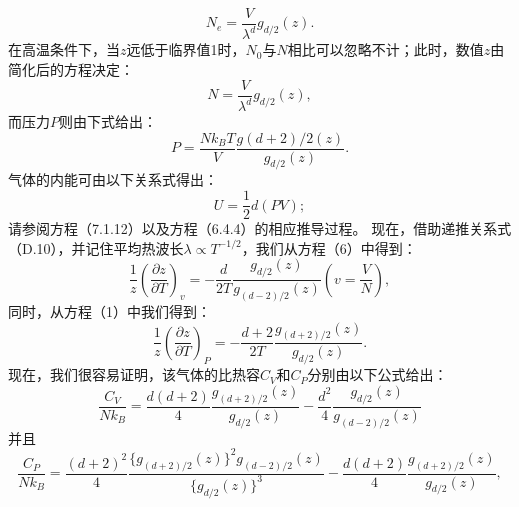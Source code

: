 \begin{equation}\tag{13.6.5}\label{eq:13.6.5}
N _ { e } = \frac { V } { \lambda ^{d} } g _ { d / 2 } ( z ) .
\end{equation}
在高温条件下，当\(z\)远低于临界值1时，\(N_0\)与\(N\)相比可以忽略不计；此时，数值\(z\)由简化后的方程决定：
\begin{equation}\tag{13.6.6}\label{eq:13.6.6}
N = \frac { V } { \lambda ^{d} } g _ { d / 2 } ( z ) ,
\end{equation}
而压力\(P\)则由下式给出：
\begin{equation}\tag{13.6.7}\label{eq:13.6.7}
P = \frac { N k _ { B } T } { V } \frac { g ( d + 2 ) / 2 ( z ) } { g _ { d / 2 } ( z ) } .
\end{equation}
气体的内能可由以下关系式得出：
\begin{equation}\tag{13.6.8}\label{eq:13.6.8}
U = { \frac { 1 } { 2 } } d ( P V ) ;
\end{equation}
请参阅方程（7.1.12）以及方程（6.4.4）的相应推导过程。
现在，借助递推关系式（D.10），并记住平均热波长\(\lambda \propto T^{-1/2}\)，我们从方程（6）中得到：
\begin{equation}\tag{13.6.9}\label{eq:13.6.9}
\frac { 1 } { z } \left( \frac { \partial z } { \partial T } \right) _ { v } = - \frac { d } { 2 T } \frac { g _ { d / 2 } ( z ) } { g _ { ( d - 2 ) / 2 } ( z ) }  \left( v = \frac { V } { N } \right) ,
\end{equation}
同时，从方程（1）中我们得到：
\begin{equation}\tag{13.6.10}\label{eq:13.6.10}
\frac { 1 } { z } \left( \frac { \partial z } { \partial T } \right) _ { P } = - \frac { d + 2 } { 2 T } \frac { g _ { ( d + 2 ) / 2 } ( z ) } { g _ { d / 2 } ( z ) } .
\end{equation}
现在，我们很容易证明，该气体的比热容\(C_V\)和\(C_P\)分别由以下公式给出：
\begin{equation}\tag{13.6.11}\label{eq:13.6.11}
\frac { C _ { V } } { N k _ { B } } = \frac { d ( d + 2 ) } { 4 } \frac { g _ { ( d + 2 ) / 2 } ( z ) } { g _ { d / 2 } ( z ) } - \frac { d ^{2} } { 4 } \frac { g _ { d / 2 } ( z ) } { g _ { ( d - 2 ) / 2 } ( z ) }
\end{equation}
并且
\begin{equation}\tag{13.6.12}\label{eq:13.6.12}
\frac { C _ { P } } { N k _ { B } } = \frac { ( d + 2 ) ^{2} } { 4 } \frac { \{ g _ { ( d + 2 ) / 2 } ( z ) \} ^{2} g _ { ( d - 2 ) / 2 } ( z ) } { \{ g _ { d / 2 } ( z ) \} ^{3} } - \frac { d ( d + 2 ) } { 4 } \frac { g _ { ( d + 2 ) / 2 } ( z ) } { g _ { d / 2 } ( z ) } ,
\end{equation}
